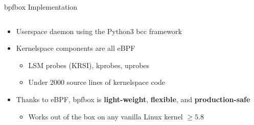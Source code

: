 \documentclass[12pt, dvipsnames, aspectratio=169]{beamer}
\begin{document}


\begin{frame}[c]{bpfbox Implementation}
\begin{columns}
    \begin{column}{0.66\textwidth}
        \begin{itemize}
            \item Userspace daemon using the Python3 bcc framework
            \vspace{2em}
            \item Kernelspace components are all eBPF
            \begin{itemize}
                \item LSM probes (KRSI), kprobes, uprobes
                \item Under 2000 source lines of kernelspace code
            \end{itemize}
            \vspace{2em}
            \item Thanks to eBPF, bpfbox is \textbf{light-weight}, \textbf{flexible}, and \textbf{production-safe}
            \begin{itemize}
                \item Works out of the box on any vanilla Linux kernel $\ge 5.8$
            \end{itemize}
        \end{itemize}
    \end{column}
    \begin{column}{0.33\textwidth}
        \begin{center}
            \color{black}

\end{center}
\end{column}
\end{columns}
\end{frame}
\end{document}
